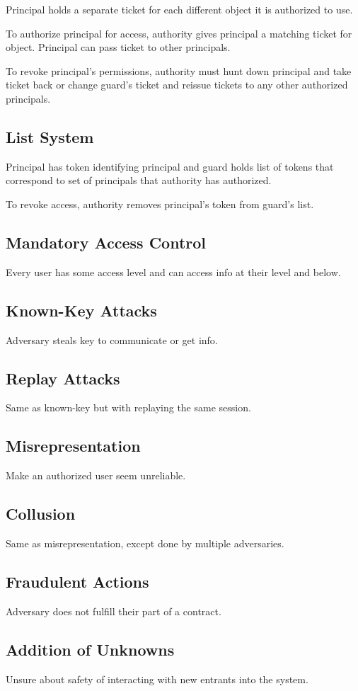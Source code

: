 \documentclass[11pt]{article}
\begin{document}
Principal holds a separate ticket for each different object it is authorized to use.

To authorize principal for access, authority gives principal a matching ticket for object.
Principal can pass ticket to other principals.

To revoke principal's permissions, authority must hunt down principal and take ticket back
or change guard's ticket and reissue tickets to any other authorized principals.
\subsection{List System}
\label{sec:org1d99523}
Principal has token identifying principal and guard holds  list of tokens that correspond
to set of principals that authority has authorized.

To revoke access, authority removes principal's token from guard's list.
\subsection{Mandatory Access Control}
\label{sec:orgadbe78f}
Every user has some access level and can access info at their level and below.
\subsection{Known-Key Attacks}
\label{sec:org2d88ed8}
Adversary steals key to communicate or get info.
\subsection{Replay Attacks}
\label{sec:orgb0cd52c}
Same as known-key but with replaying the same session.
\subsection{Misrepresentation}
\label{sec:org12e78e0}
Make an authorized user seem unreliable.
\subsection{Collusion}
\label{sec:orgdfc9696}
Same as misrepresentation, except done by multiple adversaries.
\subsection{Fraudulent Actions}
\label{sec:orge6d7df7}
Adversary does not fulfill their part of a contract.
\subsection{Addition of Unknowns}
\label{sec:orgbf9a090}
Unsure about safety of interacting with new entrants into the system.
\end{document}
